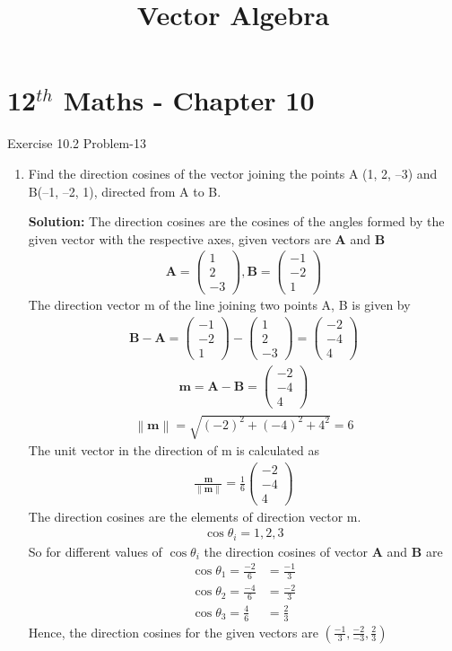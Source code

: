 \documentclass[12pt]{article}
\providecommand{\norm}[1]{\left\lVert#1\right\rVert}
\newcommand{\solution}{\noindent \textbf{Solution: }}
\newcommand{\myvec}[1]{\ensuremath{\begin{pmatrix}#1\end{pmatrix}}}
\let\vec\mathbf
\begin{document}
\begin{center}
\enlargethispage{-4cm}
\title{\textbf{Vector Algebra}}
\date{\vspace{-5ex}} %
\maketitle
\end{center}
\setcounter{page}{1}
\section*{12$^{th}$ Maths - Chapter 10}
 Exercise 10.2 Problem-13
\begin{enumerate}
\item Find the direction cosines of the vector joining the points A (1, 2, –3) and
B(–1, –2, 1), directed from A to B.

\solution The direction cosines are the cosines of the angles formed by the given vector with the respective axes, given vectors are $\vec{A}$ and $\vec{B}$
\begin{align}
	\vec{A} =\myvec{1\\2\\-3} , \vec{B}=\myvec{-1\\-2\\1}
\end{align}
The direction vector m of the line joining two points A, B is given by
\begin{align}
	\vec{B-A} = \myvec{-1\\-2\\1}-\myvec{1\\2\\-3}=\myvec{-2\\-4\\4}
\end{align}
\begin{align}
	\vec{m}=\vec{A-B}=\myvec{-2\\-4\\4}
\end{align}
\begin{align}
	\norm{\vec{m}}=\sqrt{(-2)^2+(-4)^2+4^2}=6
\end{align}
The unit vector in the direction of m is calculated as
\begin{align}
	\frac{\vec{m}}{\norm{\vec{m}}}=\frac{1}{6}{\myvec{-2\\-4\\4}}
\end{align}
The direction cosines are the elements of direction vector m.
\begin{align}
	\cos\theta_i=1,2,3  
\end{align}
So for different values of $\cos\theta_i$ the direction cosines of vector $\vec{A}$ and $\vec{B}$ are
\begin{align}
	\cos\theta_1=\frac{-2}{6}&=\frac{-1}{3}\\
	\cos\theta_2=\frac{-4}{6}&=\frac{-2}{3}\\
	\cos\theta_3=\frac{4}{6}&=\frac{2}{3}
\end{align}
Hence, the direction cosines for the given vectors are $(\frac{-1}{3},\frac{-2}{-3},\frac{2}{3})$
\end{enumerate}
\end{document}
